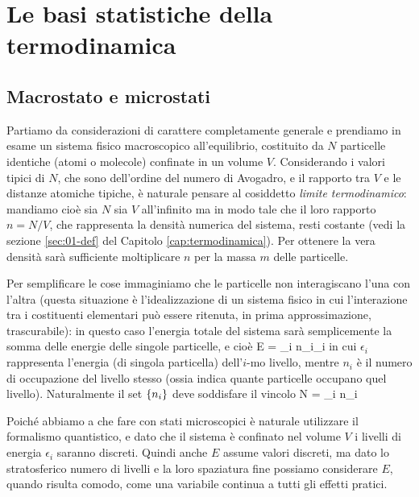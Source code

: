 \chapter{Le basi statistiche della termodinamica}
\label{cap:basi}

%
\section{Macrostato e microstati}
\label{sec:02-microstati}

Partiamo da considerazioni di carattere completamente generale e prendiamo in esame un sistema fisico macroscopico all'equilibrio, costituito da $N$ particelle identiche (atomi o molecole) confinate in un volume $V$. Considerando i valori tipici di $N$, che sono dell'ordine del numero di Avogadro, e il rapporto tra $V$ e le distanze atomiche tipiche, è naturale pensare al cosiddetto {\em limite termodinamico}: mandiamo cioè sia $N$ sia $V$ all'infinito ma in modo tale che il loro rapporto $n = N/V$, che rappresenta la densità numerica del sistema, resti costante (vedi la sezione \ref{sec:01-def} del Capitolo \ref{cap:termodinamica}). Per ottenere la vera densità sarà sufficiente moltiplicare $n$ per la massa $m$ delle particelle.

Per semplificare le cose immaginiamo che le particelle non interagiscano l'una con l'altra (questa situazione è l'idealizzazione di un sistema fisico in cui l'interazione tra i costituenti elementari può essere ritenuta, in prima approssimazione, trascurabile): in questo caso l'energia totale del sistema sarà semplicemente la somma delle energie delle singole particelle, e cioè
\be
\label{eq:02-etot}
E = \sum_{i} n_{i}\epsilon_{i}
\ee
in cui $\epsilon_{i}$ rappresenta l'energia (di singola particella) dell'$i$-mo livello, mentre $n_{i}$ è il numero di occupazione del livello stesso (ossia indica quante particelle occupano quel livello). Naturalmente il set $\{n_{i}\}$ deve soddisfare il vincolo
\be
\label{eq:02-ntot}
N = \sum_{i} n_{i}
\ee

Poiché abbiamo a che fare con stati microscopici è naturale utilizzare il formalismo quantistico, e dato che il sistema è confinato nel volume $V$ i livelli di energia $\epsilon_{i}$ saranno discreti. Quindi anche $E$ assume valori discreti, ma dato lo stratosferico numero di livelli e la loro spaziatura fine possiamo considerare $E$, quando risulta comodo, come una variabile continua a tutti gli effetti pratici.

